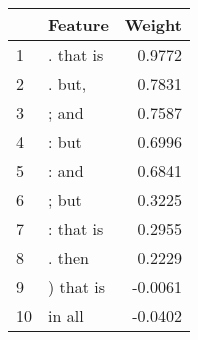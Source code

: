 \begin{tabular}{llr}
\toprule
{} &    Feature &  Weight \\
\midrule
1  &  . that is &  0.9772 \\
2  &     . but, &  0.7831 \\
3  &      ; and &  0.7587 \\
4  &      : but &  0.6996 \\
5  &      : and &  0.6841 \\
6  &      ; but &  0.3225 \\
7  &  : that is &  0.2955 \\
8  &     . then &  0.2229 \\
9  &  ) that is & -0.0061 \\
10 &     in all & -0.0402 \\
\bottomrule
\end{tabular}
